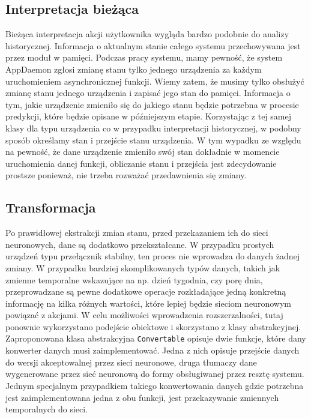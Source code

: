 
\subsection{Interpretacja bieżąca} \label{subsec:interpretacja}
Bieżąca interpretacja akcji użytkownika wygląda bardzo podobnie do analizy historycznej. Informacja o aktualnym stanie całego systemu przechowywana jest przez moduł w pamięci. Podczas pracy systemu, mamy pewność, że system AppDaemon zgłosi zmianę stanu tylko jednego urządzenia za każdym uruchomieniem asynchronicznej funkcji. Wiemy zatem, że musimy tylko obsłużyć zmianę stanu jednego urządzenia i zapisać jego stan do pamięci. Informacja o tym, jakie urządzenie zmieniło się do jakiego stanu będzie potrzebna w procesie predykcji, które będzie opisane w późniejszym etapie. Korzystając z tej samej klasy dla typu urządzenia co w przypadku interpretacji historycznej, w podobny sposób określamy stan i przejście stanu urządzenia. W tym wypadku ze względu na pewność, że dane urządzenie zmieniło swój stan dokładnie w momencie uruchomienia danej funkcji, obliczanie stanu i przejścia jest zdecydowanie prostsze ponieważ, nie trzeba rozważać przedawnienia się zmiany.

\subsection{Transformacja} \label{subsec:transformacja}
Po prawidłowej ekstrakcji zmian stanu, przed przekazaniem ich do sieci neuronowych, dane są dodatkowo przekształcane. W przypadku prostych urządzeń typu przełącznik stabilny, ten proces nie wprowadza do danych żadnej zmiany. W przypadku bardziej skomplikowanych typów danych, takich jak zmienne temporalne wskazujące na np. dzień tygodnia, czy porę dnia, przeprowadzane są pewne dodatkowe operacje rozkładające jedną konkretną informację na kilka różnych wartości, które lepiej będzie sieciom neuronowym powiązać z akcjami. W celu możliwości wprowadzenia rozszerzalności, tutaj ponownie wykorzystano podejście obiektowe i skorzystano z klasy abstrakcyjnej. Zaproponowana klasa abstrakcyjna \verb+Convertable+ opisuje dwie funkcje, które dany konwerter danych musi zaimplementować. Jedna z nich opisuje przejście danych do wersji akceptowalnej przez sieci neuronowe, druga tłumaczy dane wygenerowane przez sieć neuronową do formy obsługiwanej przez resztę systemu. Jednym specjalnym przypadkiem takiego konwertowania danych gdzie potrzebna jest zaimplementowana jedna z obu funkcji, jest przekazywanie zmiennych temporalnych do sieci.

